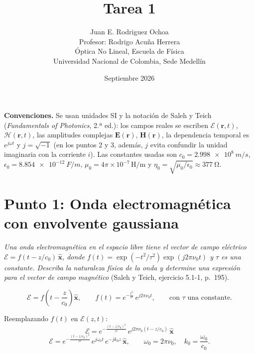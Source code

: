 \documentclass{article}
\title{Tarea 1}
\author{Juan E. Rodriguez Ochoa\\
Profesor: Rodrigo Acuña Herrera\\
Óptica No Lineal, Escuela de Física\\
Universidad Nacional de Colombia, Sede Medellín}
\date{Septiembre 2026}
\newcommand{\Ec}{\boldsymbol{\mathcal{E}}}
\newcommand{\Hc}{\boldsymbol{\mathcal{H}}}
\newcommand{\xh}{\hat{\mathbf{x}}}
\begin{document}
\maketitle

\noindent\textbf{Convenciones.} Se usan unidades SI y la notación de Saleh y Teich (\emph{Fundamentals of Photonics}, 2.ª ed.): los
campos reales se escriben $\Ec(\mathbf r,t)$, $\Hc(\mathbf r,t)$, las amplitudes complejas
$\mathbf E(\mathbf r)$, $\mathbf H(\mathbf r)$, la dependencia temporal es $e^{j\omega t}$ y
$j=\sqrt{-1}$ (en los puntos 2 y 3, además, $j$ evita confundir la unidad imaginaria con la
corriente $i$). Las constantes usadas son $c_0=\SI{2.998e8}{m/s}$,
$\epsilon_0=\SI{8.854e-12}{F/m}$, $\mu_0=4\pi\times10^{-7}\,\mathrm{H/m}$ y
$\eta_0=\sqrt{\mu_0/\epsilon_0}\approx\SI{377}{\ohm}$.

\section{Punto 1: Onda electromagnética con envolvente gaussiana}

\emph{Una onda electromagnética en el espacio libre tiene el vector de campo eléctrico
$\Ec=f(t-z/c_0)\,\xh$, donde $f(t)=\exp(-t^2/\tau^2)\exp(j2\pi\nu_0t)$ y $\tau$ es una constante.
Describa la naturaleza física de la onda y determine una expresión para el vector de campo
magnético} (Saleh y Teich, ejercicio 5.1-1, p.~195).

\bigskip

\[
\Ec=f\!\left(t-\frac{z}{c_0}\right)\xh,\qquad f(t)=e^{-\frac{t^2}{\tau^2}}\,e^{j2\pi\nu_0t},
\qquad\text{con }\tau\text{ una constante.}
\]

Reemplazando $f(t)$ en $\Ec(z,t)$:
\[
\Ec=e^{-\frac{(t-z/c_0)^2}{\tau^2}}\,e^{j2\pi\nu_0(t-z/c_0)}\,\xh
\]
\[
\Ec=e^{-\frac{(t-z/c_0)^2}{\tau^2}}\,e^{j\omega_0t}\,e^{-jk_0z}\,\xh,
\qquad \omega_0=2\pi\nu_0,\quad k_0=\frac{\omega_0}{c_0}.
\]
\end{document}
